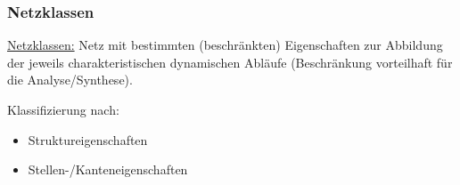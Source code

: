 
\subsubsection{Netzklassen}
\underline{Netzklassen:} Netz mit bestimmten (beschränkten) Eigenschaften zur Abbildung der jeweils charakteristischen dynamischen Abläufe (Beschränkung vorteilhaft für die Analyse/Synthese).

Klassifizierung nach:
\begin{itemize}
	\item Struktureigenschaften
	\item Stellen-/Kanteneigenschaften 
\end{itemize}

